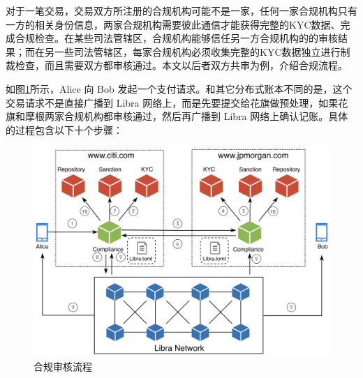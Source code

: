 对于一笔交易，交易双方所注册的合规机构可能不是一家，任何一家合规机构只有一方的相关身份信息，两家合规机构需要彼此通信才能获得完整的KYC数据、完成合规检查。在某些司法管辖区，合规机构能够信任另一方合规机构的的审核结果；而在另一些司法管辖区，每家合规机构必须收集完整的KYC数据独立进行制裁检查，而且需要双方都审核通过。本文以后者双方共审为例，介绍合规流程。

如图\ref{fig:compliance}所示，Alice 向 Bob 发起一个支付请求。和其它分布式账本不同的是，这个交易请求不是直接广播到 Libra 网络上，而是先要提交给花旗做预处理，如果花旗和摩根两家合规机构都审核通过，然后再广播到 Libra 网络上确认记账。具体的过程包含以下十个步骤：

\begin{figure}[h!]
    \centering
    \includegraphics[width=12cm, keepaspectratio]{images/compliance.png}
    \caption{合规审核流程}
    \label{fig:compliance}
\end{figure}
